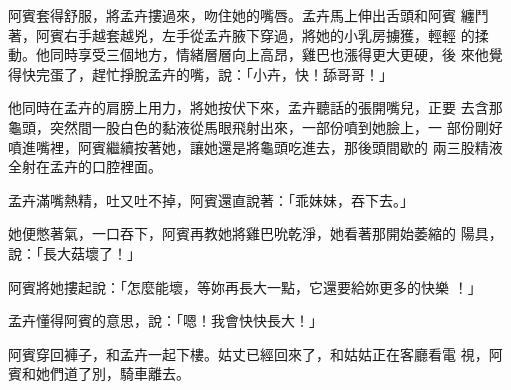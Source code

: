 阿賓套得舒服，將孟卉摟過來，吻住她的嘴唇。孟卉馬上伸出舌頭和阿賓
纏鬥著，阿賓右手越套越兇，左手從孟卉腋下穿過，將她的小乳房擄獲，輕輕
的揉動。他同時享受三個地方，情緒層層向上高昂，雞巴也漲得更大更硬，後
來他覺得快完蛋了，趕忙掙脫孟卉的嘴，說：「小卉，快！舔哥哥！」

他同時在孟卉的肩膀上用力，將她按伏下來，孟卉聽話的張開嘴兒，正要
去含那龜頭，突然間一股白色的黏液從馬眼飛射出來，一部份噴到她臉上，一
部份剛好噴進嘴裡，阿賓繼續按著她，讓她還是將龜頭吃進去，那後頭間歇的
兩三股精液全射在孟卉的口腔裡面。

孟卉滿嘴熱精，吐又吐不掉，阿賓還直說著：「乖妹妹，吞下去。」

她便憋著氣，一口吞下，阿賓再教她將雞巴吮乾淨，她看著那開始萎縮的
陽具，說：「長大菇壞了！」

阿賓將她摟起說：「怎麼能壞，等妳再長大一點，它還要給妳更多的快樂
！」

孟卉懂得阿賓的意思，說：「嗯！我會快快長大！」

阿賓穿回褲子，和孟卉一起下樓。姑丈已經回來了，和姑姑正在客廳看電
視，阿賓和她們道了別，騎車離去。










